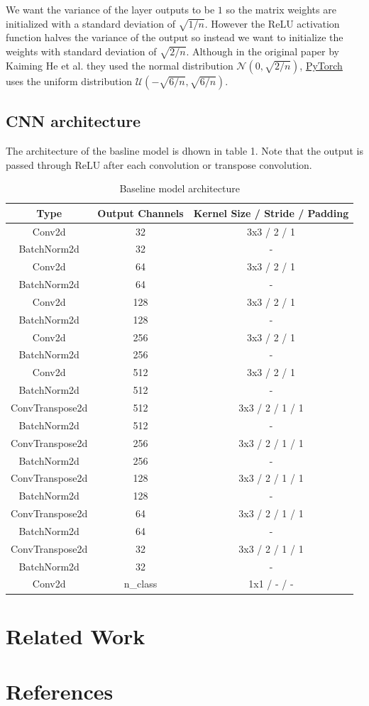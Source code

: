 \documentclass{article}
\begin{document}
We want the variance of the layer outputs to be $1$ so the matrix weights
are initialized with a standard deviation of $\sqrt{1/n}$.
However the ReLU activation function halves the variance of the output
so instead we want to initialize the weights with standard deviation of $\sqrt{2/n}$.
Although in the original paper by Kaiming He et al.
they used the normal distribution $\mathcal{N}(0, \sqrt{2/n})$,
\href{https://pytorch.org/docs/stable/nn.init.html\#torch.nn.init.kaiming\_uniform\_}{PyTorch}
uses the uniform distribution $\mathcal{U}(-\sqrt{6/n}, \sqrt{6/n})$.

\subsection{CNN architecture}

The architecture of the basline model is dhown in table 1.
Note that the output is passed through ReLU after each convolution or transpose convolution.
\begin{table}[h!]
\caption{Baseline model architecture}
\label{tab:baseline_model_architecture}
\centering
\begin{tabular}{ccc}
  \toprule
  \textbf{Type} & \textbf{Output Channels} & \textbf{Kernel Size / Stride / Padding} \\ 
  \midrule
  Conv2d & 32 & 3x3 / 2 / 1 \\ 
  BatchNorm2d & 32 & - \\ 
  Conv2d & 64 & 3x3 / 2 / 1 \\ 
  BatchNorm2d & 64 & - \\ 
  Conv2d & 128 & 3x3 / 2 / 1 \\ 
  BatchNorm2d & 128 & - \\ 
  Conv2d & 256 & 3x3 / 2 / 1 \\ 
  BatchNorm2d & 256 & - \\ 
  Conv2d & 512 & 3x3 / 2 / 1 \\ 
  BatchNorm2d & 512 & - \\ 
  ConvTranspose2d & 512 & 3x3 / 2 / 1 / 1 \\ 
  BatchNorm2d & 512 & - \\ 
  ConvTranspose2d & 256 & 3x3 / 2 / 1 / 1 \\ 
  BatchNorm2d & 256 & - \\ 
  ConvTranspose2d & 128 & 3x3 / 2 / 1 / 1 \\ 
  BatchNorm2d & 128 & - \\ 
  ConvTranspose2d & 64 & 3x3 / 2 / 1 / 1 \\ 
  BatchNorm2d & 64 & - \\ 
  ConvTranspose2d & 32 & 3x3 / 2 / 1 / 1 \\ 
  BatchNorm2d & 32 & - \\ 
  Conv2d & n\_class & 1x1 / - / - \\ 
  \bottomrule
\end{tabular}
\end{table}
\section{Related Work}

\section*{References}
\end{document}
